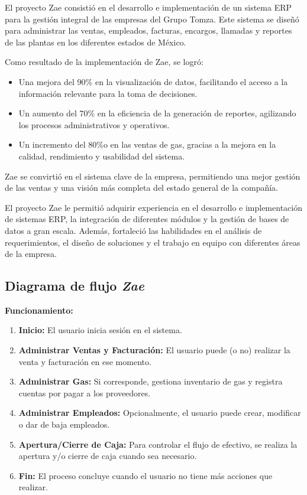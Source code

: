 \documentclass[protocolo.tex]{subfiles}
\begin{document}
El proyecto Zae consistió en el desarrollo e implementación de un sistema ERP para la gestión integral de las empresas del Grupo Tomza. Este sistema se diseñó para administrar las ventas, empleados, facturas, encargos, llamadas y reportes de las plantas en los diferentes estados de México.\vspace{4mm}

Como resultado de la implementación de Zae, se logró:

\begin{itemize}
\item Una mejora del 90\% en la visualización de datos,  facilitando el acceso a la información relevante para la toma de decisiones.
\item Un aumento del 70\% en la eficiencia de la generación de reportes,  agilizando los procesos administrativos y operativos.
\item Un incremento del 80\%o en las ventas de gas,  gracias a la mejora en la calidad, rendimiento y usabilidad del sistema.
\end{itemize}

Zae se convirtió en el sistema clave de la empresa,  permitiendo una mejor gestión de las ventas y una visión más completa del estado general de la compañía.\vspace{4mm}

El proyecto Zae le permitió adquirir experiencia en el desarrollo e implementación de sistemas ERP,  la integración de diferentes módulos y la gestión de bases de datos a gran escala. Además, fortaleció las habilidades en el análisis de requerimientos, el diseño de soluciones  y  el  trabajo  en  equipo  con  diferentes  áreas  de  la  empresa.\vspace{4mm}

\subsection{Diagrama de flujo \textit{Zae}} 
\textbf{Funcionamiento:}
\begin{enumerate}
    \item \textbf{Inicio: }  
    El usuario inicia sesión en el sistema.
    \item \textbf{Administrar Ventas y Facturación:}  
    El usuario puede (o no) realizar la venta y facturación en ese momento.
    \item \textbf{Administrar Gas:}  
    Si corresponde, gestiona inventario de gas y registra cuentas por pagar a los proveedores.
    \item \textbf{Administrar Empleados:} 
    Opcionalmente, el usuario puede crear, modificar o dar de baja empleados.
    \item \textbf{Apertura/Cierre de Caja:} 
    Para controlar el flujo de efectivo, se realiza la apertura y/o cierre de caja cuando sea necesario.
    \item \textbf{Fin:}
    El proceso concluye cuando el usuario no tiene más acciones que realizar.  
\end{enumerate}
\end{document}
